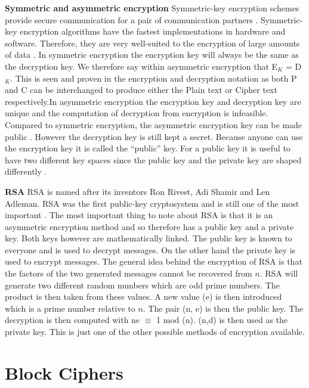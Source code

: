 \documentclass[11pt,a4paper, notitlepage]{report}
\begin{document}
\textbf{Symmetric and asymmetric encryption}
Symmetric-key encryption schemes provide secure communication for a pair of communication partners \cite{DBLP:series/isc/DelfsK07}. Symmetric-key encryption algorithms have the fastest implementations in hardware and software. Therefore, they are very well-suited to the encryption of large amounts of data \cite{DBLP:series/isc/DelfsK07}. In symmetric encryption the encryption key will always be the same as the decryption key. We therefore say within asymmetric encryption that E$_{K}$ = D$_{K}$. This is seen and proven in the encryption and decryption notation as both P and C can be interchanged to produce either the Plain text or Cipher text respectively.In asymmetric encryption the encryption key and decryption key are unique and the computation of decryption from encryption is infeasible. Compared to symmetric encryption, the asymmetric encryption key can be made public \cite{DBLP:series/isc/DelfsK07}. However the decryption key is still kept a secret. Because anyone can use the encryption key it is called the “public” key. For a public key it is useful to have two different key spaces since the public key and the private key are shaped differently \cite{DBLP:series/isc/DelfsK07}.

\textbf{RSA}
RSA is named after its inventors Ron Rivest, Adi Shamir and Len Adleman. RSA was the first public-key cryptosystem and is still one of the most important \cite{DBLP:series/isc/DelfsK07}. The most important thing to note about RSA is that it is an asymmetric encryption method and so therefore has a public key and a private key. Both keys however are mathematically linked. The public key is known to everyone and is used to decrypt messages. On the other hand the private key is used to encrypt messages. The general idea behind the encryption of RSA is that the factors of the two generated messages cannot be recovered from $n$. RSA will generate two different random numbers which are odd prime numbers. The product is then taken from these values. A new value (e) is then introduced which is a prime number relative to $n$. The pair (n, e) is then the public key. The decryption is then computed with ne $\equiv$ 1 mod (n). (n,d) is then used as the private key. This is just one of the other possible methods of encryption available.

\section{Block Ciphers}
\label{sec:BCipher}
\end{document}
